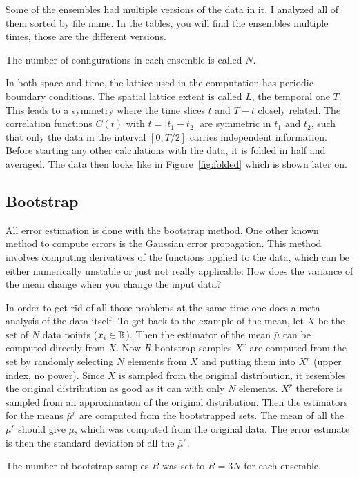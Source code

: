 \documentclass[11pt, english, fleqn, DIV=15, headinclude]{scrartcl}
\begin{document}
Some of the ensembles had multiple versions of the data in it. I analyzed all
of them sorted by file name. In the tables, you will find the ensembles
multiple times, those are the different versions.

The number of configurations in each ensemble is called $N$.

In both space and time, the lattice used in the computation has periodic
boundary conditions. The spatial lattice extent is called $L$, the temporal one
$T$. This leads to a symmetry where the time slices $t$ and $T-t$ closely
related. The correlation functions $C(t)$ with $t = |t_1 - t_2|$ are symmetric
in $t_1$ and $t_2$, such that only the data in the interval $[0, T/2]$ carries
independent information. Before starting any other calculations with the data,
it is folded in half and averaged. The data then looks like in
Figure~\ref{fig:folded} which is shown later on.

\subsection{Bootstrap}
\label{sec:bootstrap}

All error estimation is done with the bootstrap method. One other known method
to compute errors is the Gaussian error propagation. This method involves
computing derivatives of the functions applied to the data, which can be either
numerically unstable or just not really applicable: How does the variance of
the mean change when you change the input data?

In order to get rid of all those problems at the same time one does a meta
analysis of the data itself. To get back to the example of the mean, let $X$ be
the set of $N$ data points ($x_i \in \mathbb R$). Then the estimator of the mean
$\bar\mu$ can be computed directly from $X$. Now $R$ bootstrap samples $X^r$
are computed from the set by randomly selecting $N$ elements from $X$ and
putting them into $X^r$ (upper index, no power). Since $X$ is sampled from the
original distribution, it resembles the original distribution as good as it can
with only $N$ elements. $X^r$ therefore is sampled from an approximation of the
original distribution. Then the estimators for the means $\bar\mu^r$ are
computed from the bootstrapped sets. The mean of all the $\bar\mu^r$ should
give $\bar\mu$, which was computed from the original data. The error estimate
is then the standard deviation of all the $\bar\mu^r$.

The number of bootstrap samples $R$ was set to $R = 3N$ for each ensemble.
\end{document}
